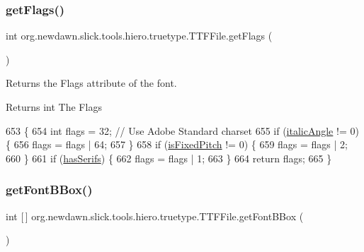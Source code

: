 \subsubsection{\texorpdfstring{get\+Flags()}{getFlags()}}
{\footnotesize\ttfamily int org.\+newdawn.\+slick.\+tools.\+hiero.\+truetype.\+T\+T\+F\+File.\+get\+Flags (\begin{DoxyParamCaption}{ }\end{DoxyParamCaption})\hspace{0.3cm}{\ttfamily [inline]}}

Returns the Flags attribute of the font. \begin{DoxyReturn}{Returns}
int The Flags 
\end{DoxyReturn}

\begin{DoxyCode}
653                           \{
654         \textcolor{keywordtype}{int} flags = 32;    \textcolor{comment}{// Use Adobe Standard charset}
655         \textcolor{keywordflow}{if} (\mbox{\hyperlink{classorg_1_1newdawn_1_1slick_1_1tools_1_1hiero_1_1truetype_1_1_t_t_f_file_af306b1630e161125026d93d856324aff}{italicAngle}} != 0) \{
656             flags = flags | 64;
657         \}
658         \textcolor{keywordflow}{if} (\mbox{\hyperlink{classorg_1_1newdawn_1_1slick_1_1tools_1_1hiero_1_1truetype_1_1_t_t_f_file_a8ff64cc3327409c093341d4a3d616a4a}{isFixedPitch}} != 0) \{
659             flags = flags | 2;
660         \}
661         \textcolor{keywordflow}{if} (\mbox{\hyperlink{classorg_1_1newdawn_1_1slick_1_1tools_1_1hiero_1_1truetype_1_1_t_t_f_file_a6a7d6badaedf94e5014891ccc59cf319}{hasSerifs}}) \{
662             flags = flags | 1;
663         \}
664         \textcolor{keywordflow}{return} flags;
665     \}
\end{DoxyCode}
\mbox{\label{classorg_1_1newdawn_1_1slick_1_1tools_1_1hiero_1_1truetype_1_1_t_t_f_file_a8f9f39119c294649b3f907c7bcf1b4b8}} 
\subsubsection{\texorpdfstring{get\+Font\+B\+Box()}{getFontBBox()}}
{\footnotesize\ttfamily int \mbox{[}$\,$\mbox{]} org.\+newdawn.\+slick.\+tools.\+hiero.\+truetype.\+T\+T\+F\+File.\+get\+Font\+B\+Box (\begin{DoxyParamCaption}{ }\end{DoxyParamCaption})\hspace{0.3cm}{\ttfamily [inline]}}

